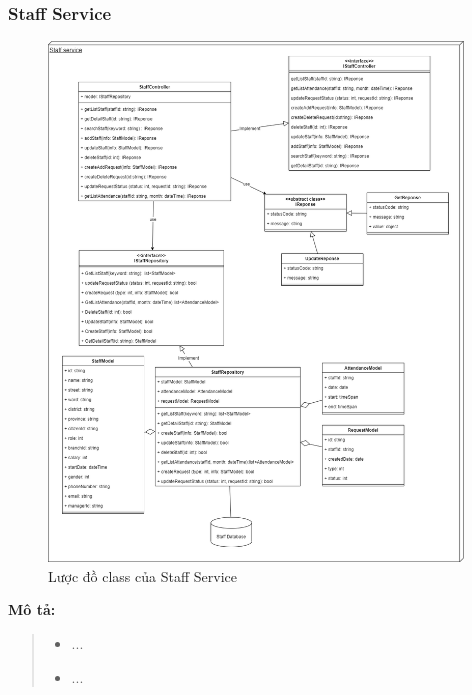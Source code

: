 \subsubsection{Staff Service}
\begin{figure}[!htp]
	\centering
	\includegraphics[width=11cm]{img/Architecture/service/StaffService.png}
	\newline
	\caption{Lược đồ class của Staff Service}
\end{figure}
\textbf{Mô tả:}
\begin{quote}
	\begin{itemize}
		\item ...
		\item ...
	\end{itemize}
\end{quote}


